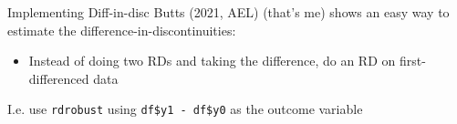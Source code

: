\documentclass[aspectratio=169,t,11pt,table]{beamer}
\begin{document}
\begin{frame}{Implementing Diff-in-disc}
  Butts (2021, AEL) (that's me) shows an easy way to estimate the difference-in-discontinuities:

  \begin{itemize}
    \item Instead of doing two RDs and taking the difference, do an RD on first-differenced data 
  \end{itemize}

  \bigskip
  I.e. use \texttt{rdrobust} using \texttt{df\$y1 - df\$y0} as the outcome variable
\end{frame}
\end{document}

